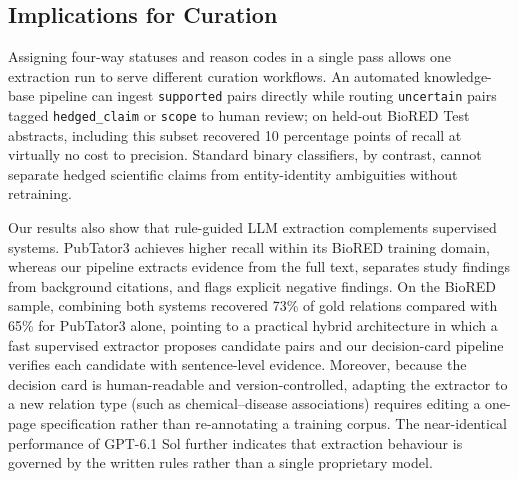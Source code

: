 \documentclass[preprint,10pt,letterpaper]{elsarticle}
\newcommand{\st}[1]{\texttt{#1}}             %
\begin{document}
\subsection{Implications for Curation}
Assigning four-way statuses and reason codes in a single pass allows one extraction run to serve different curation workflows. An automated knowledge-base pipeline can ingest \st{supported} pairs directly while routing \st{uncertain} pairs tagged \st{hedged\_claim} or \st{scope} to human review; on held-out BioRED Test abstracts, including this subset recovered 10 percentage points of recall at virtually no cost to precision. Standard binary classifiers, by contrast, cannot separate hedged scientific claims from entity-identity ambiguities without retraining.

Our results also show that rule-guided LLM extraction complements supervised systems. PubTator3 achieves higher recall within its BioRED training domain, whereas our pipeline extracts evidence from the full text, separates study findings from background citations, and flags explicit negative findings. On the BioRED sample, combining both systems recovered 73\% of gold relations compared with 65\% for PubTator3 alone, pointing to a practical hybrid architecture in which a fast supervised extractor proposes candidate pairs and our decision-card pipeline verifies each candidate with sentence-level evidence. Moreover, because the decision card is human-readable and version-controlled, adapting the extractor to a new relation type (such as chemical--disease associations) requires editing a one-page specification rather than re-annotating a training corpus. The near-identical performance of GPT-6.1 Sol further indicates that extraction behaviour is governed by the written rules rather than a single proprietary model.
\end{document}
